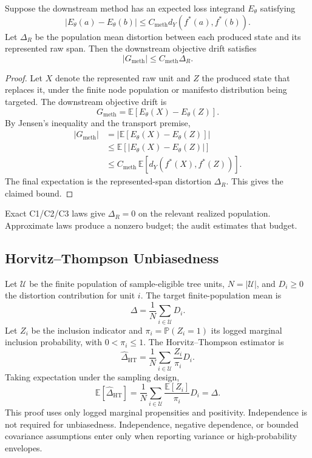 \begin{proposition}
\label{prop:v8-population-transport}
Suppose the downstream method has an expected loss integrand \(E_\theta\)
satisfying
\[
  |E_\theta(a)-E_\theta(b)|
  \le
  C_{\mathrm{meth}}d_Y(f^\ast(a),f^\ast(b)).
\]
Let \(\Delta_R\) be the population mean distortion between each produced state
and its represented raw span. Then the downstream objective drift satisfies
\[
  |G_{\mathrm{meth}}|
  \le
  C_{\mathrm{meth}}\Delta_R .
\]
\end{proposition}

\begin{proof}
Let \(X\) denote the represented raw unit and \(Z\) the produced state
that replaces it, under the finite node population or manifesto
distribution being targeted. The downstream objective drift is
\[
  G_{\mathrm{meth}}=\mathbb E[E_\theta(X)-E_\theta(Z)] .
\]
By Jensen's inequality and the transport premise,
\[
\begin{aligned}
|G_{\mathrm{meth}}|
&=
\left|\mathbb E\!\left[E_\theta(X)-E_\theta(Z)\right]\right|\\
&\le
\mathbb E\!\left[|E_\theta(X)-E_\theta(Z)|\right]\\
&\le
C_{\mathrm{meth}}\,
\mathbb E\!\left[d_Y(f^\ast(X),f^\ast(Z))\right].
\end{aligned}
\]
The final expectation is the represented-span distortion
\(\Delta_R\). This gives the claimed bound.
\end{proof}

Exact C1/C2/C3 laws give \(\Delta_R=0\) on the relevant realized population.
Approximate laws produce a nonzero budget; the audit estimates that budget.

\subsection{Horvitz--Thompson Unbiasedness}

Let \(\mathcal U\) be the finite population of sample-eligible tree units,
\(N=|\mathcal U|\), and \(D_i\ge 0\) the distortion contribution for unit
\(i\). The target finite-population mean is
\[
  \Delta=\frac{1}{N}\sum_{i\in\mathcal U}D_i .
\]
Let \(Z_i\) be the inclusion indicator and
\(\pi_i=\mathbb P(Z_i=1)\) its logged marginal inclusion probability, with
\(0<\pi_i\le 1\). The Horvitz--Thompson estimator is
\[
  \widehat{\Delta}_{\mathrm{HT}}
  =
  \frac{1}{N}\sum_{i\in\mathcal U}\frac{Z_i}{\pi_i}D_i .
\]
Taking expectation under the sampling design,
\[
  \mathbb E[\widehat{\Delta}_{\mathrm{HT}}]
  =
  \frac{1}{N}\sum_{i\in\mathcal U}
  \frac{\mathbb E[Z_i]}{\pi_i}D_i
  =
  \Delta .
\]
This proof uses only logged marginal propensities and positivity. Independence
is not required for unbiasedness. Independence, negative dependence, or
bounded covariance assumptions enter only when reporting variance or
high-probability envelopes.

